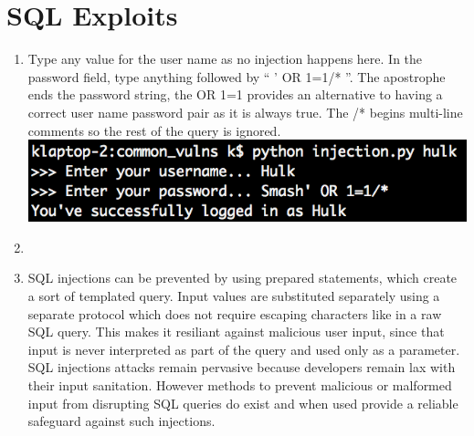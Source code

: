 \documentclass[9pt,a4paper]{article}
\begin{document}
\section{SQL Exploits}
\begin{enumerate}
\item Type any value for the user name as no injection happens here. In the password field, type anything followed by `` ' OR 1=1/* ''. The apostrophe ends the password string, the OR 1=1 provides an alternative to having a correct user name password pair as it is always true. The /* begins multi-line comments so the rest of the query is ignored.\\
\includegraphics{inject}
\item
\item SQL injections can be prevented by using prepared statements, which create a sort of templated query. Input values are substituted separately using a separate protocol which does not require escaping characters like in a raw SQL query. This makes it resiliant against malicious user input, since that input is never interpreted as part of the query and used only as a parameter. SQL injections attacks remain pervasive because developers remain lax with their input sanitation. However methods to prevent malicious or malformed input from disrupting SQL queries do exist and when used provide a reliable safeguard against such injections.
\end{enumerate}
\end{document}
